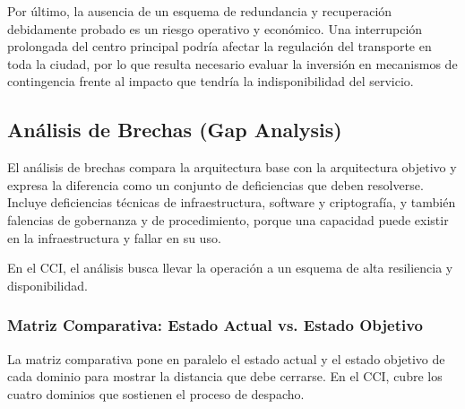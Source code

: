 Por último, la ausencia de un esquema de redundancia y recuperación debidamente probado es un riesgo operativo y económico. Una interrupción prolongada del centro principal podría afectar la regulación del transporte en toda la ciudad, por lo que resulta necesario evaluar la inversión en mecanismos de contingencia frente al impacto que tendría la indisponibilidad del servicio.

\subsection{Análisis de Brechas (Gap Analysis)}
\label{sec:gap-analysis}

El análisis de brechas compara la arquitectura base con la arquitectura objetivo y expresa la diferencia como un conjunto de deficiencias que deben resolverse. Incluye deficiencias técnicas de infraestructura, software y criptografía, y también falencias de gobernanza y de procedimiento, porque una capacidad puede existir en la infraestructura y fallar en su uso.

En el CCI, el análisis busca llevar la operación a un esquema de alta resiliencia y disponibilidad.

\subsubsection{Matriz Comparativa: Estado Actual vs. Estado Objetivo}
\label{sec:matriz-brechas}

La matriz comparativa pone en paralelo el estado actual y el estado objetivo de cada dominio para mostrar la distancia que debe cerrarse. En el CCI, cubre los cuatro dominios que sostienen el proceso de despacho.

